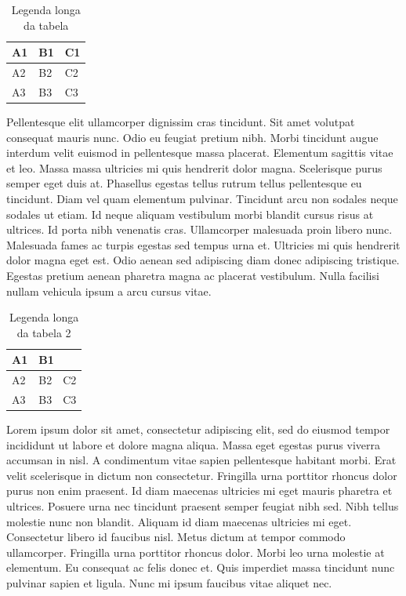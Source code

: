 \documentclass[12pt]{article}
\begin{document}
			\begin{table}[H]
				\centering
				\caption[Legenda curta da tabela]{Legenda longa da tabela}
				\label{tab:tab1}
				\begin{tabular}{ l|l|l } %
					A1 & B1 & C1 \\ \hline 
					A2 & B2 & C2 \\ \hline
					A3 & B3 & C3 \\ %
				\end{tabular}
				\vspace{-30pt}
			\end{table}
		
			Pellentesque elit ullamcorper dignissim cras tincidunt. Sit amet volutpat consequat mauris nunc. Odio eu feugiat pretium nibh. Morbi tincidunt augue interdum velit euismod in pellentesque massa placerat. Elementum sagittis vitae et leo. Massa massa ultricies mi quis hendrerit dolor magna. Scelerisque purus semper eget duis at. Phasellus egestas tellus rutrum tellus pellentesque eu tincidunt. Diam vel quam elementum pulvinar. Tincidunt arcu non sodales neque sodales ut etiam. Id neque aliquam vestibulum morbi blandit cursus risus at ultrices. Id porta nibh venenatis cras. Ullamcorper malesuada proin libero nunc. Malesuada fames ac turpis egestas sed tempus urna et. Ultricies mi quis hendrerit dolor magna eget est. Odio aenean sed adipiscing diam donec adipiscing tristique. Egestas pretium aenean pharetra magna ac placerat vestibulum. Nulla facilisi nullam vehicula ipsum a arcu cursus vitae.
			
			\begin{table}[H] %
				\centering
				\caption[Legenda curta da tabela 2]{Legenda longa da tabela 2}
				\label{tab:tab2}
				\begin{tabular}{|l|l|l|}
					\hline
					A1 & \multicolumn{2}{l|}{B1} \\ \hline %
					A2 & B2         & C2         \\ \hline
					A3 & B3         & C3         \\ \hline
				\end{tabular}
			\end{table}
			
			Lorem ipsum dolor sit amet, consectetur adipiscing elit, sed do eiusmod tempor incididunt ut labore et dolore magna aliqua. Massa eget egestas purus viverra accumsan in nisl. A condimentum vitae sapien pellentesque habitant morbi. Erat velit scelerisque in dictum non consectetur. Fringilla urna porttitor rhoncus dolor purus non enim praesent. Id diam maecenas ultricies mi eget mauris pharetra et ultrices. Posuere urna nec tincidunt praesent semper feugiat nibh sed. Nibh tellus molestie nunc non blandit. Aliquam id diam maecenas ultricies mi eget. Consectetur libero id faucibus nisl. Metus dictum at tempor commodo ullamcorper. Fringilla urna porttitor rhoncus dolor. Morbi leo urna molestie at elementum. Eu consequat ac felis donec et. Quis imperdiet massa tincidunt nunc pulvinar sapien et ligula. Nunc mi ipsum faucibus vitae aliquet nec.
\end{document}
